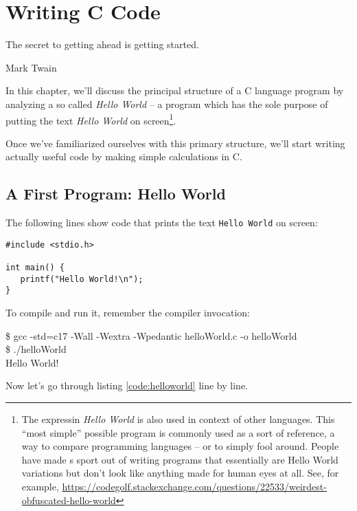 
\chapter{Writing C Code}
\epigraph{The secret to getting ahead is getting started.}{Mark Twain}

In this chapter, we'll discuss the principal structure of a C language program by analyzing a so called \emph{Hello World} -- a program which has the sole purpose of putting the text \emph{Hello World} on screen\footnote{The expressin \emph{Hello World} is also used in context of other languages. This \enquote{most simple} possible program is commonly used as a sort of reference, a way to compare programming languages -- or to simply fool around. People have made s sport out of writing programs that essentially are Hello World variations but don't look like anything made for human eyes at all. See, for example, \url{https://codegolf.stackexchange.com/questions/22533/weirdest-obfuscated-hello-world}}.

Once we've familiarized ourselves with this primary structure, we'll start writing actually useful code by making simple calculations in C.

\section{A First Program: Hello World}

The following lines show code that prints the text \texttt{Hello World} on screen:
\begin{codebox}[helloworld.c]
\begin{verbatim}
#include <stdio.h>

int main() {
   printf("Hello World!\n");
}
\end{verbatim}
 \label{code:helloworld}
\end{codebox}

To compile and run it, remember the compiler invocation:

\begin{cmdbox}
\$ gcc -std=c17 -Wall -Wextra -Wpedantic helloWorld.c -o helloWorld \\
\$ ./helloWorld \\
Hello World!
\end{cmdbox}

Now let's go through listing \ref{code:helloworld} line by line.

